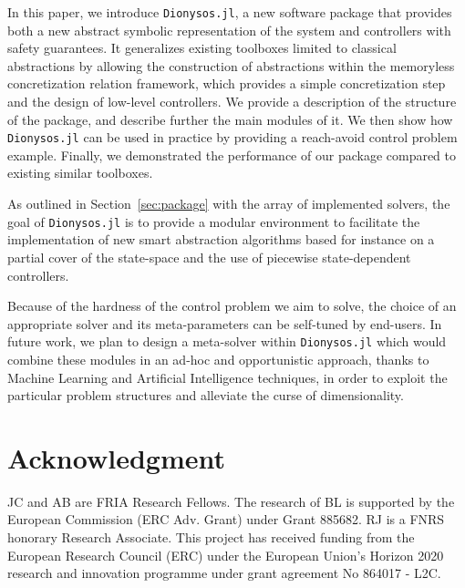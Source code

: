 \documentclass{juliacon}
\begin{document}
In this paper, we introduce \texttt{Dionysos.jl}, a new software package that provides both a new abstract symbolic representation of the system and controllers with safety guarantees. It generalizes existing toolboxes limited to classical abstractions by allowing the construction of abstractions within the memoryless concretization relation framework, which provides a simple concretization step and the design of low-level controllers.
%
We provide a description of the structure of the package, and describe further the main modules of it. We then show how \texttt{Dionysos.jl} can be used in practice by providing a reach-avoid control problem example. Finally, we demonstrated the performance of our package compared to existing similar toolboxes.

\vskip 6pt
%
As outlined in Section~\ref{sec:package} with the array of implemented solvers, the goal of \texttt{Dionysos.jl} is to provide a modular environment to facilitate the implementation of new smart abstraction algorithms based for instance on a partial cover of the state-space and the use of piecewise state-dependent controllers.

\vskip 6pt
Because of the hardness of the control problem we aim to solve, the choice of an appropriate solver and its meta-parameters can be self-tuned by end-users.
In future work, we plan to design a meta-solver within \texttt{Dionysos.jl} which would combine these modules in an ad-hoc and opportunistic approach, thanks to Machine Learning and Artificial Intelligence techniques, in order to exploit the particular problem structures and alleviate the curse of dimensionality.

\section{Acknowledgment}
JC and AB are FRIA Research Fellows.
The research of BL is supported by the European Commission (ERC Adv. Grant) under Grant 885682.
RJ is a FNRS honorary Research Associate. This project has received funding from the European Research Council (ERC) under the European Union's Horizon 2020 research and innovation programme under grant agreement No 864017 - L2C.


%

\end{document}
